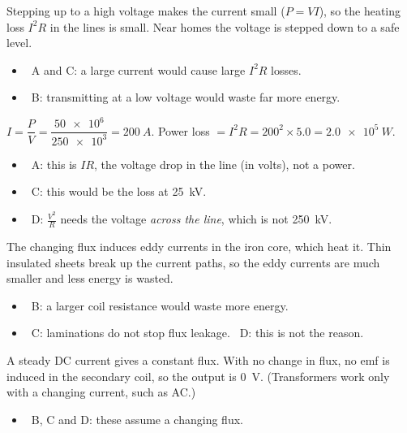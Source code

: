 \documentclass[12pt]{article}
\begin{document}
\begin{practiceanswers}
\begin{practiceans}
  Stepping up to a high voltage makes the current small ($P = VI$), so the heating loss $I^2R$ in the
  lines is small. Near homes the voltage is stepped down to a safe level.
  \begin{itemize}
    \item \xmark\ A and C: a large current would cause large $I^2R$ losses.
    \item \xmark\ B: transmitting at a low voltage would waste far more energy.
  \end{itemize}
\end{practiceans}

\begin{practiceans}
  $I = \dfrac{P}{V} = \dfrac{\num{50e6}}{\num{250e3}} = \qty{200}{A}$. Power loss
  $= I^2R = 200^2 \times 5.0 = \qty{2.0e5}{W}$.
  \begin{itemize}
    \item \xmark\ A: this is $IR$, the voltage drop in the line (in volts), not a power.
    \item \xmark\ C: this would be the loss at \qty{25}{kV}.
    \item \xmark\ D: $\frac{V^2}{R}$ needs the voltage \emph{across the line}, which is not \qty{250}{kV}.
  \end{itemize}
\end{practiceans}

\begin{practiceans}
  The changing flux induces eddy currents in the iron core, which heat it. Thin insulated sheets break
  up the current paths, so the eddy currents are much smaller and less energy is wasted.
  \begin{itemize}
    \item \xmark\ B: a larger coil resistance would waste more energy.
    \item \xmark\ C: laminations do not stop flux leakage. \quad \xmark\ D: this is not the reason.
  \end{itemize}
\end{practiceans}

\begin{practiceans}
  A steady DC current gives a constant flux. With no change in flux, no emf is induced in the secondary
  coil, so the output is \qty{0}{V}. (Transformers work only with a changing current, such as AC.)
  \begin{itemize}
    \item \xmark\ B, C and D: these assume a changing flux.
  \end{itemize}
\end{practiceans}


\end{practiceanswers}
\end{document}
